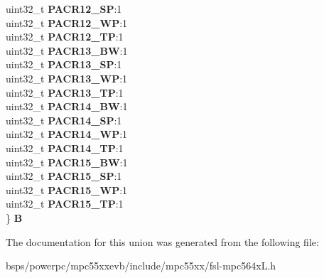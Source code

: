 \begin{DoxyCompactItemize}
\begin{tabbing}
\>uint32\_t {\bfseries PACR12\_SP}:1\\
\>uint32\_t {\bfseries PACR12\_WP}:1\\
\>uint32\_t {\bfseries PACR12\_TP}:1\\
\>uint32\_t {\bfseries PACR13\_BW}:1\\
\>uint32\_t {\bfseries PACR13\_SP}:1\\
\>uint32\_t {\bfseries PACR13\_WP}:1\\
\>uint32\_t {\bfseries PACR13\_TP}:1\\
\>uint32\_t {\bfseries PACR14\_BW}:1\\
\>uint32\_t {\bfseries PACR14\_SP}:1\\
\>uint32\_t {\bfseries PACR14\_WP}:1\\
\>uint32\_t {\bfseries PACR14\_TP}:1\\
\>uint32\_t {\bfseries PACR15\_BW}:1\\
\>uint32\_t {\bfseries PACR15\_SP}:1\\
\>uint32\_t {\bfseries PACR15\_WP}:1\\
\>uint32\_t {\bfseries PACR15\_TP}:1\\
\} {\bfseries B}\\

\end{tabbing}\end{DoxyCompactItemize}


The documentation for this union was generated from the following file\+:\begin{DoxyCompactItemize}
\item 
bsps/powerpc/mpc55xxevb/include/mpc55xx/fsl-\/mpc564x\+L.\+h\end{DoxyCompactItemize}
